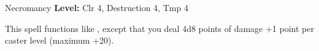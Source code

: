 {Necromancy}
{
	\textbf{Level:}
	Clr 4, Destruction 4, Tmp 4\\
}
{
	This spell functions like , except that you deal 4d8 points of damage +1 point per caster level (maximum +20).

}
